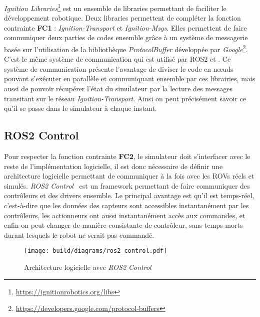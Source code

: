             \textit{Ignition Libraries}\footnote{\url{https://ignitionrobotics.org/libs}} est un ensemble de libraries permettant de faciliter le développement robotique. Deux libraries permettent de compléter la fonction contrainte \textbf{FC1} : \textit{Ignition-Transport} et \textit{Ignition-Msgs}. Elles permettent de faire communiquer deux parties de codes ensemble grâce à un système de messagerie basée sur l'utilisation de la bibliothèque \textit{ProtocolBuffer} développée par \textit{Google}\footnote{\url{https://developers.google.com/protocol-buffers}}. C'est le même système de communication qui est utilisé par \gls{ROS2} et \gazebo{}. Ce système de communication présente l'avantage de diviser le code en n\oe uds pouvant s'exécuter en parallèle et communiquant ensemble par ces librairies, mais aussi de pouvoir récupérer l'état du simulateur par la lecture des messages transitant sur le réseau \textit{Ignition-Transport}. Ainsi on peut précisément savoir ce qu'il se passe dans le simulateur à chaque instant.

        \subsection{ROS2 Control}

            Pour respecter la fonction contrainte \textbf{FC2}, le simulateur doit s'interfacer avec le reste de l'implémentation logicielle, il est donc nécessaire de définir une architecture logicielle permettant de communiquer à la fois avec les \gls{ROV}s réels et simulés. \textit{ROS2 Control}~\cite{ros_control} est un framework permettant de faire communiquer des contrôleurs et des drivers ensemble. Le principal avantage est qu'il est temps-réel, c'est-à-dire que les données des capteurs sont accessibles instantanément par les contrôleurs, les actionneurs ont aussi instantanément accès aux commandes, et enfin on peut changer de manière consistante de contrôleur, sans temps morts durant lesquels le robot ne serait pas commandé.

            \begin{figure}[!htb]
                \centering
                \texttt{[image: build/diagrams/ros2\_control.pdf]}
                \caption{Architecture logicielle avec \textit{ROS2 Control}}
                \label{fig:ros2_control}
            \end{figure}

